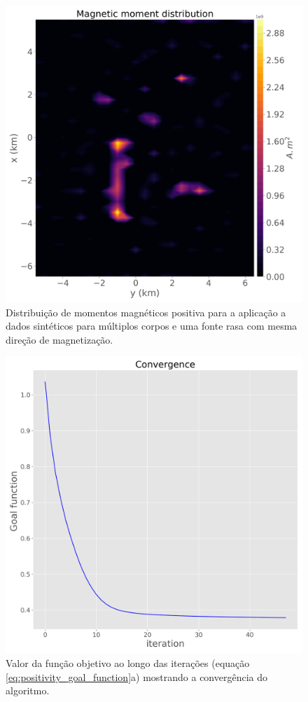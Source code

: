 \begin{figure}
	\centering
	\includegraphics[width=.9\textwidth]{Fig/eqlayer/unidir_shallow_test/magnetic_moment_positive_LM_NNLS_magRM.png}
	\caption{Distribuição de momentos magnéticos positiva para a aplicação a dados sintéticos para múltiplos corpos e uma fonte rasa com mesma direção de magnetização.}
	\label{fig:dist_momentos_pos_2}
\end{figure}

\begin{figure}
	\centering
	\includegraphics[width=.9\textwidth]{Fig/eqlayer/unidir_shallow_test/convergence_LM_NNLS_magRM.png}
	\caption{Valor da função objetivo ao longo das iterações (equação \ref{eq:positivity_goal_function}a) mostrando a convergência do algoritmo.}
	\label{fig:convergence_2}
\end{figure}

